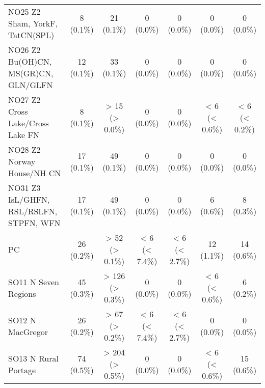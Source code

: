 \documentclass{article}
\begin{document}
\begin{table}[htbp]
\begin{tabular}{l*{6}{c}}
  NO25 Z2 Sham, YorkF, TatCN(SPL)                       &            8 (0.1\%)            &            21 (0.1\%)           &            0 (0.0\%)            &            0 (0.0\%)            &            0 (0.0\%)            &            0 (0.0\%)            \\
  NO26 Z2 Bu(OH)CN, MS(GR)CN, GLN/GLFN                  &            12 (0.1\%)           &            33 (0.1\%)           &            0 (0.0\%)            &            0 (0.0\%)            &            0 (0.0\%)            &            0 (0.0\%)            \\
  NO27 Z2 Cross Lake/Cross Lake FN                      &            8 (0.1\%)            &          > 15 (> 0.0\%)         &            0 (0.0\%)            &            0 (0.0\%)            &          < 6 (< 0.6\%)          &          < 6 (< 0.2\%)          \\
  NO28 Z2 Norway House/NH CN                            &            17 (0.1\%)           &            49 (0.1\%)           &            0 (0.0\%)            &            0 (0.0\%)            &            0 (0.0\%)            &            0 (0.0\%)            \\
  NO31 Z3 IsL/GHFN, RSL/RSLFN, STPFN, WFN               &            17 (0.1\%)           &            49 (0.1\%)           &            0 (0.0\%)            &            0 (0.0\%)            &            6 (0.6\%)            &            8 (0.3\%)            \\
  PC                                                    &            26 (0.2\%)           &          > 52 (> 0.1\%)         &          < 6 (< 7.4\%)          &          < 6 (< 2.7\%)          &            12 (1.1\%)           &            14 (0.6\%)           \\
  SO11 N Seven Regions                                  &            45 (0.3\%)           &         > 126 (> 0.3\%)         &            0 (0.0\%)            &            0 (0.0\%)            &          < 6 (< 0.6\%)          &            6 (0.2\%)            \\
  SO12 N MacGregor                                      &            26 (0.2\%)           &          > 67 (> 0.2\%)         &          < 6 (< 7.4\%)          &          < 6 (< 2.7\%)          &            0 (0.0\%)            &            0 (0.0\%)            \\
  SO13 N Rural Portage                                  &            74 (0.5\%)           &         > 204 (> 0.5\%)         &            0 (0.0\%)            &            0 (0.0\%)            &          < 6 (< 0.6\%)          &            15 (0.6\%)           \\

\end{tabular}
\end{table}
\end{document}
